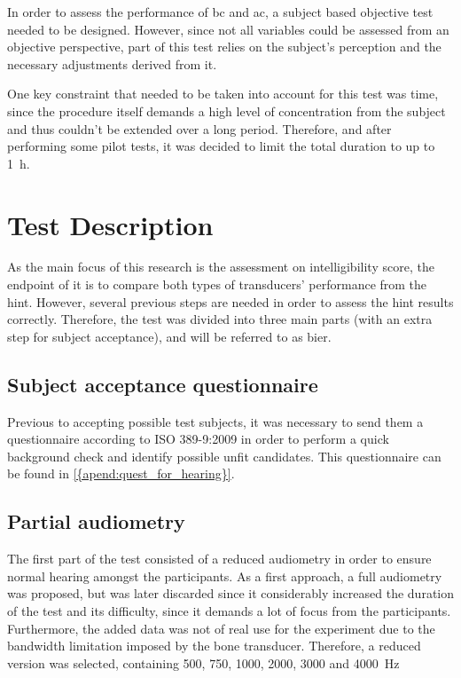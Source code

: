 In order to assess the performance of \gls{bc} and \gls{ac}, a subject based objective test needed to be designed. However, since not all variables could be assessed from an objective perspective, part of this test relies on the subject's perception and the necessary adjustments derived from it.

One key constraint that needed to be taken into account for this test was time, since the procedure itself demands a high level of concentration from the subject and thus couldn't be extended over a long period. Therefore, and after performing some pilot tests, it was decided to limit the total duration to up to \SI{1}{\hour}.
\section{Test Description}
\label{sec:test_description}

As the main focus of this research is the assessment on intelligibility score, the endpoint of it is to compare both types of transducers' performance from the \gls{hint}. However, several previous steps are needed in order to assess the \gls{hint} results correctly. Therefore, the test was divided into three main parts (with an extra step for subject acceptance), and will be referred to as \gls{bier}.

\subsection{Subject acceptance questionnaire}
Previous to accepting possible test subjects, it was necessary to send them a questionnaire according to ISO 389-9:2009 \citep{iso_389-9} in order to perform a quick background check and identify possible unfit candidates. This questionnaire can be found in \autoref{{apend:quest_for_hearing}}.

\subsection{Partial audiometry}
The first part of the test consisted of a reduced audiometry in order to ensure normal hearing amongst the participants. As a first approach, a full audiometry was proposed, but was later discarded since it considerably increased the duration of the test and its difficulty, since it demands a lot of focus from the participants. Furthermore, the added data was not of real use for the experiment due to the bandwidth limitation imposed by the bone transducer.
Therefore, a reduced version was selected, containing 500, 750, 1000, 2000, 3000 and \SI{4000}{\hertz}

